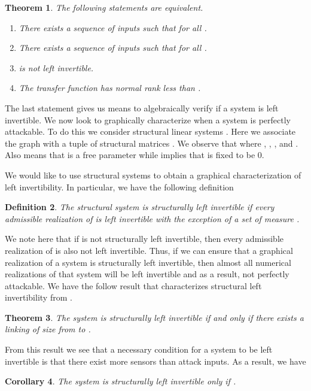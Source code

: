 \documentclass[letterpaper, 10 pt, conference]{ieeeconf}
\newtheorem{theorem}{Theorem}
\newtheorem{corollary}[theorem]{Corollary}
\newtheorem{definition}[theorem]{Definition}
\begin{document}
\begin{theorem}
The following statements are equivalent.
\begin{enumerate}
\item There exists a sequence of inputs  such that  for all .
\item There exists a sequence of inputs  such that  for all .
\item  is not left invertible.
\item The transfer function  has normal rank less than .
\end{enumerate}
\end{theorem}
The last statement gives us means to algebraically verify if a system is left invertible. We now look to graphically characterize when a system is perfectly attackable. To do this we consider structural linear systems \cite{Lin1974}. Here we associate the graph  with a tuple of structural matrices . We observe that  where , , , and . Also  means that  is a free parameter while  implies that  is fixed to be 0.

We would like to use structural systems to obtain a graphical characterization of left invertibility. In particular, we have the following definition
\begin{definition}
The structural system  is structurally left invertible if every admissible realization of  is left invertible with the exception of a set of measure .
\end{definition}
We note here that if  is not structurally left invertible, then every admissible realization of  is also not left invertible. Thus, if we can ensure that a graphical realization of a system is structurally left invertible, then almost all numerical realizations of that system will be left invertible and as a result, not perfectly attackable. We have the follow result that characterizes structural left invertibility from \cite{PasqualettiAttack}.
\begin{theorem}
The system  is structurally left invertible if and only if there exists a linking of size  from  to .
\end{theorem}
From this result we see that a necessary condition for a system to be left invertible is that there exist more sensors than attack inputs. As a result, we have
\begin{corollary}
The system  is structurally left invertible only if .
\end{corollary}
\end{document}
